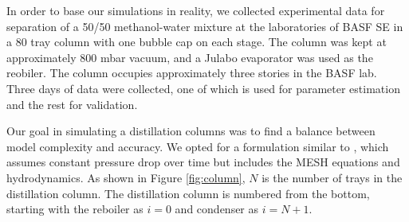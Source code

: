 In order to base our simulations in reality, we collected experimental data for separation of a 50/50 methanol-water mixture at the laboratories of BASF SE in a 80 tray column with one bubble cap on each stage. The column was kept at approximately 800 mbar vacuum, and a Julabo evaporator was used as the reobiler. The column occupies approximately three stories in the BASF lab.  Three days of data were collected, one of which is used for parameter estimation and the rest for validation. 

Our goal in simulating a distillation columns was to find a balance between model complexity and accuracy. We opted for a formulation similar to \citet{Diehl2001}, which assumes constant pressure drop over time but includes the MESH equations and hydrodynamics. As shown in Figure \ref{fig:column}, $N$ is the number of trays in the distillation column. The distillation column is numbered from the bottom, starting with the reboiler as $i=0$ and condenser as $i=N+1$.  

